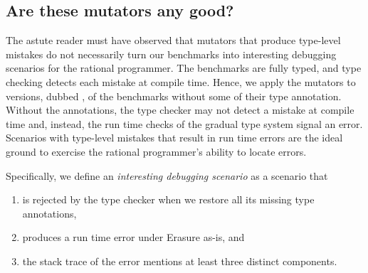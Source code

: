 

\subsection{Are these mutators any good?}

The astute reader must have observed that mutators that produce 
type-level mistakes do not necessarily turn our benchmarks into
interesting debugging scenarios for the rational programmer.  The
benchmarks are fully typed, and type checking detects each mistake at
compile time.  Hence, we apply the mutators to versions, dubbed
, of the benchmarks without 
some  of their type annotation.  Without the annotations, the type
checker may not detect a mistake at compile time and, instead, the run
time checks
of the gradual type system signal an error.  Scenarios
with type-level mistakes that result in run time errors are the ideal
ground to exercise the rational programmer's ability to locate errors.

Specifically, we define an \emph{interesting debugging scenario} as a
scenario that
\begin{enumerate} 
  \item is rejected by the type checker when we restore all its missing type annotations, 
  \item produces a run time error under Erasure as-is, and 
  \item the stack trace of the error mentions at least three distinct components.  
\end{enumerate}

